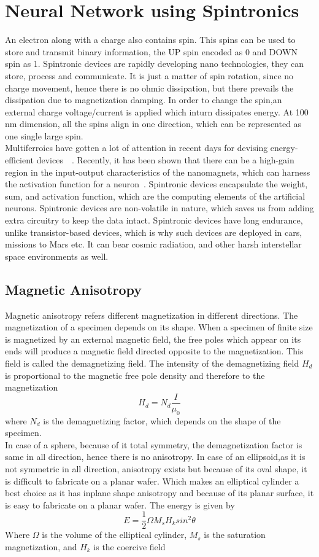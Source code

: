 \documentclass[12pt,a4paper,bold]{thesis}
\theoremstyle{thm}
\theoremstyle{definition}
\begin{document}
\section{Neural Network using Spintronics}
An electron along with a charge also contains spin. This spins can be used to store and transmit binary information, the UP spin encoded as 0 and DOWN spin as 1. Spintronic devices are rapidly developing nano technologies, they can store, process and communicate. It is just a matter of spin rotation, since no charge movement, hence there is no ohmic dissipation, but there prevails the dissipation due to magnetization damping. In order to change the spin,an external charge voltage/current is applied which inturn dissipates energy. At 100 nm dimension, all the spins align in one direction, which can be represented as one single large spin.~\cite{nature_news_art,roy15_1}\\
Multiferroics have gotten a lot of attention in recent days for devising energy-efficient devices~\cite{roy2020energy}~\cite{roy2017spintronics}. Recently, it has been shown that there can be a high-gain region in the input-output characteristics of the nanomagnets, which can harness the activation function for a neuron~\cite{roy2017ultralow}. Spintronic devices encapsulate the weight, sum, and activation function, which are the computing elements of the artificial neurons. Spintronic devices are non-volatile in nature, which saves us from adding extra circuitry to keep the data intact. Spintronic devices have long endurance, unlike transistor-based devices, which is why such devices are deployed in cars, missions to Mars etc. It can bear cosmic radiation, and other harsh interstellar space environments as well.~\cite{roy15_2}~\cite{roy15_3}
\subsection{Magnetic Anisotropy}
Magnetic anisotropy refers different magnetization in different directions. The magnetization of a specimen depends on its shape. When a specimen of finite size is magnetized by an external magnetic field, the free poles which appear on its ends will produce a magnetic field directed opposite to the magnetization. This field is called the demagnetizing field. The intensity of the demagnetizing field $H_d$ is proportional to the magnetic free pole density and therefore to the magnetization
\[H_d=N_d\frac{I}{\mu_0}\]
where $N_d$ is the demagnetizing factor, which depends on the shape of the specimen.\\
In case of a sphere, because of it total symmetry, the demagnetization factor is same in all direction, hence there is no anisotropy.
In case of an ellipsoid,as it is not symmetric in all direction, anisotropy exists but because of its oval shape, it is difficult to fabricate on a planar wafer.
Which makes an elliptical cylinder a best choice as it has inplane shape anisotropy and because of its planar surface, it is easy to fabricate on a planar wafer. The energy is given by 
\[E=\frac{1}{2}\Omega M_s H_k sin^2 \theta \] 
Where $\Omega$ is the volume of the elliptical cylinder, $M_s$ is the saturation magnetization, and $H_k$ is the coercive field
\end{document}

